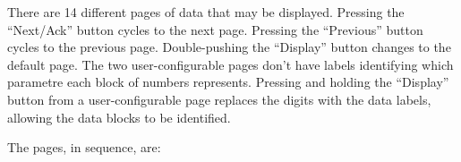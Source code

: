 There are 14 different pages of data that may be displayed. Pressing the ``Next/Ack'' button cycles to the next page. Pressing the ``Previous'' button cycles to the previous page. Double-pushing the ``Display'' button changes to the default page. The two user-configurable pages don't have labels identifying which parametre each block of numbers represents. Pressing and holding the ``Display'' button from a user-configurable page replaces the digits with the data labels, allowing the data blocks to be identified.

The pages, in sequence, are:

\newlength{\tabletopspace} 
\setlength{\tabletopspace}{.5ex} 
\newlength{\tablebottomspace}
\setlength{\tablebottomspace}{.5ex}

